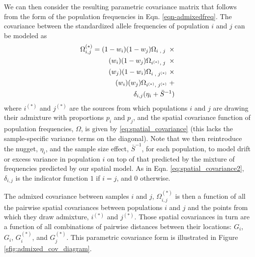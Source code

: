 \documentclass[12pt]{article}
\newcommand{\kadmixsource}[1]{{$G^{(*)}_{#1}$}}
\newcommand{\identifyadmixsource}[1]{{#1^{(*)}}}
\begin{document}

We can then consider the resulting parametric covariance matrix that follows from the form of the population frequencies in Eqn. \eqref{eqn-admixedfreq}. The covariance between the standardized allele frequencies of population $i$ and $j$ can be modeled as 
\begin{alignat}{3}
\label{eq:admixed_covariance_1}
\Omega_{i,j}^{(*)} = (1-w_i)(1-w_j) \Omega_{i\;,\;j\;} \; \times&\\
(w_i)(1-w_j) \Omega_{\identifyadmixsource{i},\;j\;} \; \times   \notag&\\
(w_j)(1-w_i) \Omega_{i\;,\;\identifyadmixsource{j}} \; \times   \notag&\\
(w_i)(w_j) \Omega_{\identifyadmixsource{i},\;\identifyadmixsource{j}} \; +   \notag&\\
\delta_{i,j} (\eta_i + \bar{S}^{-1}) \notag&
\end{alignat}
where $\identifyadmixsource{i}$ and $\identifyadmixsource{j}$ are the sources from which populations $i$ and $j$ are drawing their admixture with proportions $p_i$ and $p_j$, and the spatial covariance function of population frequencies, $\Omega$, is given by \eqref{eq:spatial_covariance} (this lacks the sample-specific variance terms on the diagonal). Note that we then reintroduce the nugget, $\eta_i$, and the sample size effect, $\bar{S}^{-1}$, for each population, to model drift or excess variance in population $i$ on top of that predicted by the mixture of frequencies predicted by our spatial model.  As in Eqn. \eqref{eq:spatial_covariance2}, $\delta_{i,j} $ is the indicator function $1$ if $i=j$, and $0$ otherwise. 


The admixed covariance between samples $i$ and $j$, $\Omega_{i,j}^{(*)}$ is then a function of all the pairwise spatial covariances between populations $i$ and $j$ and the points from which they draw admixture, $\identifyadmixsource{i}$ and $\identifyadmixsource{j}$.  Those spatial covariances in turn are a function of all combinations of pairwise distances between their locations: $G_i$, $G_i$, \kadmixsource{i}, and \kadmixsource{j}.  This parametric covariance form is illustrated in Figure \ref{sfig:admixed_cov_diagram}.
\end{document}
